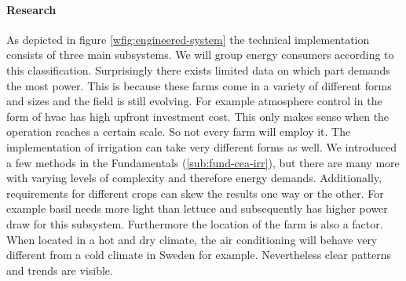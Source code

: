 
\paragraph{Research}
As depicted in figure \ref{wfig:engineered-system} the technical implementation consists of three main subsystems.
We will group energy consumers according to this classification.
Surprisingly there exists limited data on which part demands the most power.
This is because these farms come in a variety of different forms and sizes and the field is still evolving.
For example atmosphere control in the form of \ac{hvac} has high upfront investment cost.
This only makes sense when the operation reaches a certain scale. %
So not every farm will employ it.
The implementation of irrigation can take very different forms as well.
We introduced a few methods in the Fundamentals (\ref{sub:fund-cea-irr}), but there are many more with varying levels of complexity and therefore energy demands.
Additionally, requirements for different crops can skew the results one way or the other.
For example basil needs more light than lettuce and subsequently has higher power draw for this subsystem.
Furthermore the location of the farm is also a factor.
When located in a hot and dry climate, the air conditioning will behave very different from a cold climate in Sweden for example. 
Nevertheless clear patterns and trends are visible.

